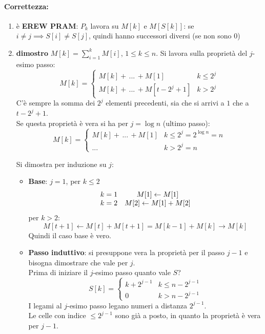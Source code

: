 \documentclass[11pt]{article}
\begin{document}
	\paragraph{Correttezza:}
	\begin{enumerate}
		\item è \textbf{EREW PRAM}: $P_k$ lavora su $M[k]$ e $M[S[k]]$: se $i \neq j \implies S[i] \neq S[j]$, quindi hanno successori diversi (se non sono 0)
		\item \textbf{dimostro} $M[k] = \sum_{i=1}^k M[i]$, $1 \leq k \leq n$. Si lavora sulla proprietà del $j$-esimo passo:
		$$ M[k] = \begin{cases}
			M[k] + \, ... \, + M[1] & k \leq 2^j \\
			M[k] + \, ... \, + M[t- 2^j + 1] & k > 2^j
		\end{cases}
		$$
		C'è sempre la somma dei $2^j$ elementi precedenti, sia che si arrivi a $1$ che a $t-2^j+1$. \\
		Se questa proprietà è vera si ha per $j=\log n$ (ultimo passo):
		$$ M[k] = \begin{cases}
			M[k] + \, ... \, + M[1] & k \leq 2^j = 2^{\log n} = n \\
			... & k>2^j = n
		\end{cases}
		$$
		
		Si dimostra per induzione su $j$:
		\begin{itemize}
			\item \textbf{Base}: $j=1$, per $k \leq 2$
			$$ 
			\begin{array}{c c}
				k = 1 & M[1] \leftarrow M[1]  \\
				k = 2 & M[2] \leftarrow M[1] + M[2]
			\end{array}
			$$
			per $k > 2$:
			$$ 
			M[t + 1] \leftarrow M[t] + M[t+1] = M[k-1] + M[k] \rightarrow M[k]
			$$
			Quindi il caso base è vero.\\
			
			
			\newpage
			
			\item \textbf{Passo induttivo}: si presuppone vera la proprietà per il passo $j-1$ e bisogna dimostrare che vale per $j$. \\
			Prima di iniziare il $j$-esimo passo quanto vale $S$?
			$$ S[k] = \begin{cases}
				k + 2^{j-1} & k \leq n-2^{j-1} \\
				0 & k > n - 2^{j-1}
			\end{cases}$$
			I legami al $j$-esimo passo legano numeri a distanza $2^{j-1}$.\\
			Le celle con indice $\leq 2^{j-1}$ sono già a posto, in quanto la proprietà è vera per $j-1$.\\
			

\end{itemize}
\end{enumerate}
\end{document}
